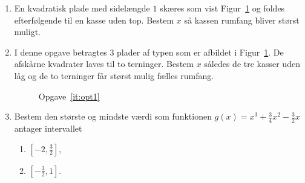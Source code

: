\begin{enumerate}
	\item\label{it:opt1} En kvadratisk plade med sidelængde $1$ skæres som vist Figur~\ref{fig:opt1} og foldes efterfølgende til en kasse uden top. Bestem $x$ så kassen rumfang bliver størst muligt.
	
	\item I denne opgave betragtes $3$ plader af typen som er afbildet i Figur~\ref{fig:opt1}. De afskårne kvadrater laves til to terninger. Bestem $x$ således de tre kasser uden låg og de to terninger får størst mulig fælles rumfang. 
	

	
	\begin{figure}
		\centering
		\caption{Opgave~\ref{it:opt1}}
		\label{fig:opt1}
	\end{figure} 


	\item Bestem den største og mindste værdi som funktionen $ g(x)=x^3+\frac{3}{4}x^2-\frac{3}{2}x $ antager intervallet
	\begin{enumerate}
		\item $ [-2,\frac{3}{2}] $,
		\item $ [-\frac{3}{2},1] $.
	\end{enumerate}
 

\end{enumerate}
